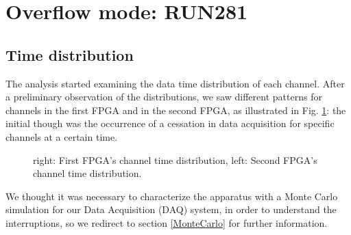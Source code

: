 \section{Overflow mode: RUN281}
\subsection{Time distribution}
The analysis started examining the data time distribution of each channel.
After a preliminary observation of the distributions, we saw different patterns for channels in the first FPGA and in the second FPGA,
as illustrated in Fig. \ref{fig:1}: the initial though  was the occurrence of a cessation in data acquisition for specific channels at a certain time.

\begin{figure}[H]
  \hspace{-0.5in}
  \caption{
    \label{fig:1}
    right: First FPGA's channel time distribution, left: Second FPGA's channel time distribution.
  }
\end{figure}
We thought it was necessary to characterize the apparatus with a Monte Carlo simulation for our Data Acquisition (DAQ) system, in order to understand the interruptions,
so we redirect to section \ref{MonteCarlo} for further information.
